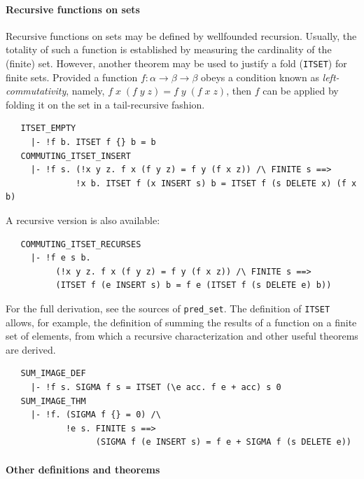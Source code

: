 {\paragraph{Recursive functions on sets}

Recursive functions on sets may be defined by wellfounded
recursion. Usually, the totality of such a function is established by
measuring the cardinality of the (finite) set. However, another
theorem may be used to justify a fold ({\small\verb+ITSET+}) for finite sets.
Provided a function $f:\alpha\to\beta\to\beta$ obeys a condition
known as \emph{left-commutativity}, namely, $f\;x\;(f\;y\;z) =
f\;y\;(f\;x\;z)$, then $f$ can be applied by folding it on the set
in a tail-recursive fashion.
\begin{hol}
\begin{verbatim}
   ITSET_EMPTY
     |- !f b. ITSET f {} b = b
   COMMUTING_ITSET_INSERT
     |- !f s. (!x y z. f x (f y z) = f y (f x z)) /\ FINITE s ==>
              !x b. ITSET f (x INSERT s) b = ITSET f (s DELETE x) (f x b)
\end{verbatim}
\end{hol}
A recursive version is also available:
\begin{hol}
\begin{verbatim}
   COMMUTING_ITSET_RECURSES
     |- !f e s b.
          (!x y z. f x (f y z) = f y (f x z)) /\ FINITE s ==>
          (ITSET f (e INSERT s) b = f e (ITSET f (s DELETE e) b))
\end{verbatim}
\end{hol}
For the full derivation, see the sources of {\small\verb+pred_set+}.
The definition of {\small\verb+ITSET+} allows, for example, the
definition of summing the results of a function on a finite set of
elements, from which a recursive characterization and other useful
theorems are derived.
%
\begin{hol}
\begin{verbatim}
   SUM_IMAGE_DEF
     |- !f s. SIGMA f s = ITSET (\e acc. f e + acc) s 0
   SUM_IMAGE_THM
     |- !f. (SIGMA f {} = 0) /\
            !e s. FINITE s ==>
                  (SIGMA f (e INSERT s) = f e + SIGMA f (s DELETE e))
\end{verbatim}
\end{hol}

\paragraph{Other definitions and theorems}

}
